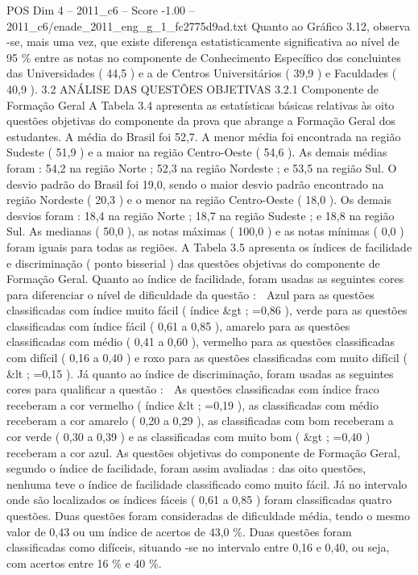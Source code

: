 \begin{textsample}{POS Dim 4 – 2011\_c6 – Score -1.00 – 2011\_c6/enade\_2011\_eng\_g\_1\_fc2775d9ad.txt}
Quanto ao Gráfico 3.12, observa -se, mais uma vez, que existe diferença estatisticamente significativa ao nível de 95 \% entre as notas no componente de Conhecimento Específico dos concluintes das Universidades ( 44,5 ) e a de Centros Universitários ( 39,9 ) e Faculdades ( 40,9 ). 3.2 ANÁLISE DAS QUESTÕES OBJETIVAS 3.2.1 Componente de Formação Geral A Tabela 3.4 apresenta as estatísticas básicas relativas às oito questões objetivas do componente da prova que abrange a Formação Geral dos estudantes.
A média do Brasil foi 52,7.
A menor média foi encontrada na região Sudeste ( 51,9 ) e a maior na região Centro-Oeste ( 54,6 ).
As demais médias foram : 54,2 na região Norte ; 52,3 na região Nordeste ; e 53,5 na região Sul.
O desvio padrão do Brasil foi 19,0, sendo o maior desvio padrão encontrado na região Nordeste ( 20,3 ) e o menor na região Centro-Oeste ( 18,0 ).
Os demais desvios foram : 18,4 na região Norte ; 18,7 na região Sudeste ; e 18,8 na região Sul.
As medianas ( 50,0 ), as notas máximas ( 100,0 ) e as notas mínimas ( 0,0 ) foram iguais para todas as regiões.
A Tabela 3.5 apresenta os índices de facilidade e discriminação ( ponto bisserial ) das questões objetivas do componente de Formação Geral.
Quanto ao índice de facilidade, foram usadas as seguintes cores para diferenciar o nível de dificuldade da questão :  Azul para as questões classificadas com índice muito fácil ( índice \&gt ; =0,86 ), verde para as questões classificadas com índice fácil ( 0,61 a 0,85 ), amarelo para as questões classificadas com médio ( 0,41 a 0,60 ), vermelho para as questões classificadas com difícil ( 0,16 a 0,40 ) e roxo para as questões classificadas com muito difícil ( \&lt ; =0,15 ).
Já quanto ao índice de discriminação, foram usadas as seguintes cores para qualificar a questão :  As questões classificadas com índice fraco receberam a cor vermelho ( índice \&lt ; =0,19 ), as classificadas com médio receberam a cor amarelo ( 0,20 a 0,29 ), as classificadas com bom receberam a cor verde ( 0,30 a 0,39 ) e as classificadas com muito bom ( \&gt ; =0,40 ) receberam a cor azul.
As questões objetivas do componente de Formação Geral, segundo o índice de facilidade, foram assim avaliadas : das oito questões, nenhuma teve o índice de facilidade classificado como muito fácil.
Já no intervalo onde são localizados os índices fáceis ( 0,61 a 0,85 ) foram classificadas quatro questões.
Duas questões foram consideradas de dificuldade média, tendo o mesmo valor de 0,43 ou um índice de acertos de 43,0 \%.
Duas questões foram classificadas como difíceis, situando -se no intervalo entre 0,16 e 0,40, ou seja, com acertos entre 16 \% e 40 \%.

\end{textsample}
